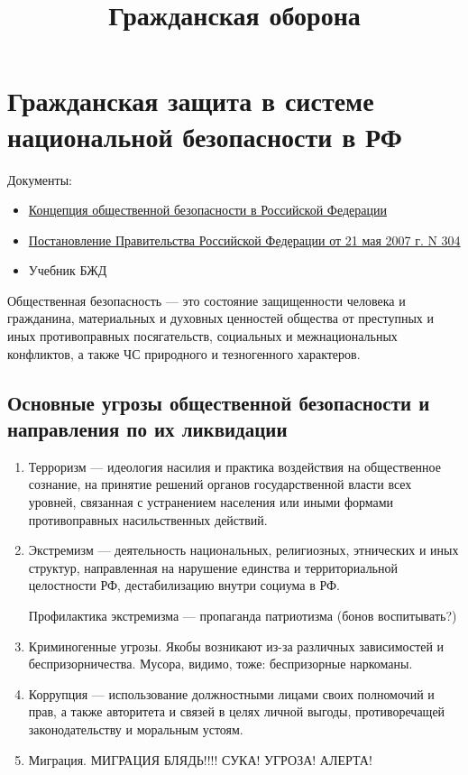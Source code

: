 \textsl{}\documentclass[oneside,final,14pt]{extreport}
\begin{document}
\title{Гражданская оборона}

\maketitle

\chapter*{Гражданская защита в системе национальной безопасности в РФ}
Документы:
\begin{itemize}
	\item \href{http://kremlin.ru/acts/news/19653}{Концепция общественной безопасности в Российской Федерации}
	\item \href{http://www.rg.ru/2007/05/26/chs-dok.html}{Постановление Правительства Российской Федерации от 21 мая 2007 г. N 304}
	\item Учебник БЖД
\end{itemize}

Общественная безопасность --- это состояние защищенности человека и гражданина, материальных и духовных ценностей общества от преступных и иных противоправных посягательств, социальных и межнациональных конфликтов, а также ЧС природного и тезногенного характеров.

\section*{Основные угрозы общественной безопасности и направления по их ликвидации}
\begin{enumerate}
	\item Терроризм --- идеология насилия и практика воздействия на общественное сознание, на принятие решений органов государственной власти всех уровней, связанная с устранением населения или иными формами противоправных насильственных действий.
	\item Экстремизм --- деятельность национальных, религиозных, этнических и иных структур, направленная на нарушение единства и территориальной целостности РФ, дестабилизацию внутри социума в РФ.
	
	Профилактика экстремизма --- пропаганда патриотизма (бонов воспитывать?)
	\item Криминогенные угрозы. Якобы возникают из-за различных зависимостей и беспризорничества. Мусора, видимо, тоже: беспризорные наркоманы.
	\item Коррупция --- использование должностными лицами своих полномочий и прав, а также авторитета и связей в целях личной выгоды, противоречащей законодательству и моральным устоям.
	\item Миграция. МИГРАЦИЯ БЛЯДЬ!!!! СУКА! УГРОЗА! АЛЕРТА!
\end{enumerate}
\end{document}
